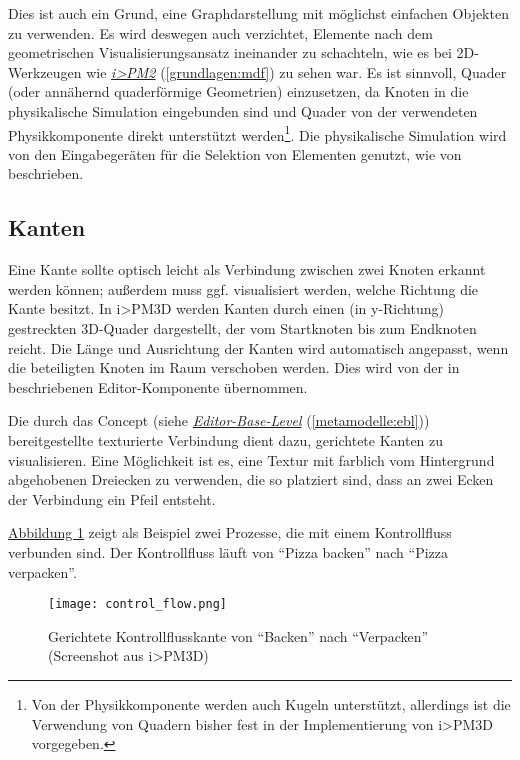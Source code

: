 \documentclass[a4paper,10pt]{sphinxmanual}
\begin{document}
Dies ist auch ein Grund, eine Graphdarstellung mit möglichst einfachen Objekten zu verwenden.
Es wird deswegen auch verzichtet, Elemente nach dem geometrischen Visualisierungsansatz ineinander zu schachteln, wie es bei 2D-Werkzeugen wie {\hyperref[grundlagen:mdf]{\emph{i\textgreater{}PM2}}} (\autoref*{grundlagen:mdf}) zu sehen war.
Es ist sinnvoll, Quader (oder annähernd quaderförmige Geometrien) einzusetzen, da Knoten in die physikalische Simulation eingebunden sind und Quader von der verwendeten Physikkomponente direkt unterstützt werden\footnote{
Von der Physikkomponente werden auch Kugeln unterstützt, allerdings ist die Verwendung von Quadern bisher fest in der Implementierung von i\textgreater{}PM3D vorgegeben.
}.
Die physikalische Simulation wird von den Eingabegeräten für die Selektion von Elementen genutzt, wie von \cite{buchi} beschrieben.


\subsection{Kanten}
\label{visualisierung:id2}\label{visualisierung:kanten}
Eine Kante sollte optisch leicht als Verbindung zwischen zwei Knoten erkannt werden können; außerdem muss ggf. visualisiert werden, welche Richtung die Kante besitzt.
In i\textgreater{}PM3D werden Kanten durch einen (in y-Richtung) gestreckten 3D-Quader dargestellt, der vom Startknoten bis zum Endknoten reicht.
Die Länge und Ausrichtung der Kanten wird automatisch angepasst, wenn die beteiligten Knoten im Raum verschoben werden.
Dies wird von der in \cite{uli} beschriebenen Editor-Komponente übernommen.

Die durch das Concept  (siehe {\hyperref[metamodelle:ebl]{\emph{Editor-Base-Level}}} (\autoref*{metamodelle:ebl})) bereitgestellte texturierte Verbindung dient dazu, gerichtete Kanten zu visualisieren.
Eine Möglichkeit ist es, eine Textur mit farblich vom Hintergrund abgehobenen Dreiecken zu verwenden, die so platziert sind, dass an zwei Ecken der Verbindung ein Pfeil entsteht.

\hyperref[visualisierung:gerichtete-verbindung]{Abbildung  \ref*{visualisierung:gerichtete-verbindung}} zeigt als Beispiel zwei Prozesse, die mit einem Kontrollfluss verbunden sind. Der Kontrollfluss läuft von "`Pizza backen"' nach "`Pizza verpacken"'.
\begin{figure}[htbp]
\centering
\capstart

\texttt{[image: control\_flow.png]}
\caption{Gerichtete Kontrollflusskante von "`Backen"' nach "`Verpacken"' (Screenshot aus i\textgreater{}PM3D)}\label{visualisierung:gerichtete-verbindung}\end{figure}
\end{document}
